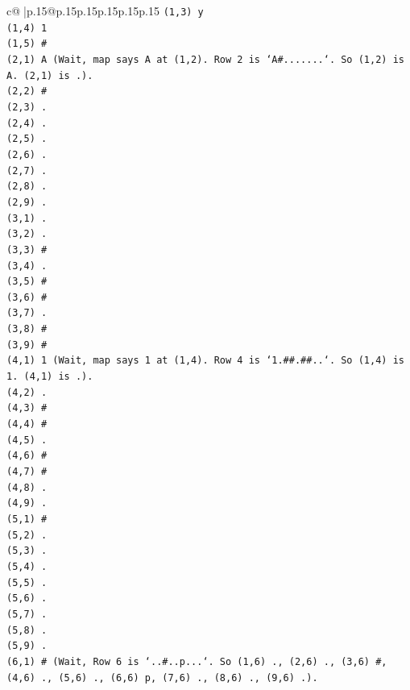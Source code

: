 \documentclass{article}
\begin{document}
{\begin{supertabular}{c@{$\;$}|p{.15\linewidth}@{}p{.15\linewidth}p{.15\linewidth}p{.15\linewidth}p{.15\linewidth}p{.15\linewidth}}
{{{\texttt{(1,3) y} \\
\texttt{(1,4) 1} \\
\texttt{(1,5) \#} \\
\texttt{(2,1) A (Wait, map says A at (1,2). Row 2 is `A\#.......`. So (1,2) is A. (2,1) is .).} \\
\texttt{(2,2) \#} \\
\texttt{(2,3) .} \\
\texttt{(2,4) .} \\
\texttt{(2,5) .} \\
\texttt{(2,6) .} \\
\texttt{(2,7) .} \\
\texttt{(2,8) .} \\
\texttt{(2,9) .} \\
\texttt{(3,1) .} \\
\texttt{(3,2) .} \\
\texttt{(3,3) \#} \\
\texttt{(3,4) .} \\
\texttt{(3,5) \#} \\
\texttt{(3,6) \#} \\
\texttt{(3,7) .} \\
\texttt{(3,8) \#} \\
\texttt{(3,9) \#} \\
\texttt{(4,1) 1 (Wait, map says 1 at (1,4). Row 4 is `1.\#\#.\#\#..`. So (1,4) is 1. (4,1) is .).} \\
\texttt{(4,2) .} \\
\texttt{(4,3) \#} \\
\texttt{(4,4) \#} \\
\texttt{(4,5) .} \\
\texttt{(4,6) \#} \\
\texttt{(4,7) \#} \\
\texttt{(4,8) .} \\
\texttt{(4,9) .} \\
\texttt{(5,1) \#} \\
\texttt{(5,2) .} \\
\texttt{(5,3) .} \\
\texttt{(5,4) .} \\
\texttt{(5,5) .} \\
\texttt{(5,6) .} \\
\texttt{(5,7) .} \\
\texttt{(5,8) .} \\
\texttt{(5,9) .} \\
\texttt{(6,1) \# (Wait, Row 6 is `..\#..p...`. So (1,6) ., (2,6) ., (3,6) \#, (4,6) ., (5,6) ., (6,6) p, (7,6) ., (8,6) ., (9,6) .).} \\
}}}
\end{supertabular}}
\end{document}
